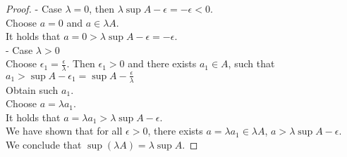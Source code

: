 \documentclass{article}
\theoremstyle{mytheoremstyle}
\theoremstyle{mytheoremstyle}
\theoremstyle{myproblemstyle}
\begin{document}
\begin{proof}
        - Case $\lambda = 0$, then $\lambda \sup A - \epsilon = -\epsilon < 0$. \\
        Choose $a = 0$ and $a \in \lambda A$. \\
        It holds that $a = 0 > \lambda \sup A - \epsilon = -\epsilon$. \\

        - Case $\lambda > 0$ \\
        Choose $\epsilon_1 = \displaystyle\frac{\epsilon}{\lambda}$. Then $\epsilon_1 > 0$ and there exists $a_1 \in A$, such that $a_1 > \sup A - \epsilon_1 = \sup A - \frac{\epsilon}{\lambda}$ \\
        Obtain such $a_1$. \\
        Choose $a = \lambda a_1$. \\
        It holds that $a = \lambda a_1 > \lambda \sup A - \epsilon$. \\
        We have shown that for all $\epsilon > 0$, there exists $a = \lambda a_1 \in \lambda A$, $a > \lambda \sup A - \epsilon$. \\
        We conclude that $\sup (\lambda A) = \lambda \sup A$.
    \end{proof}

    \newpage
\end{document}

